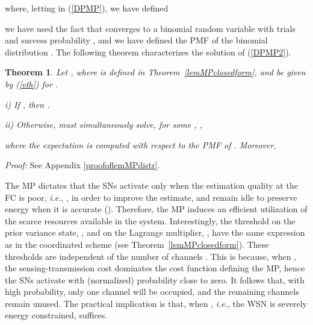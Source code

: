 \documentclass[10pt,twocolumn,twoside]{IEEEtran}
\newtheorem{thm}{Theorem}
\theoremstyle{plain}
\begin{document}
where, letting  in (\ref{DPMP}), we have defined

  we have used the fact that
  converges to a binomial random variable with  trials and success probability
  \cite[Corollary~1]{MichelusiP1},
and we have defined the PMF of the binomial distribution .
The following theorem characterizes the solution of (\ref{DPMP2}).
\vspace{-3mm}
\begin{thm}
\label{lemMPdistr}
Let
,
where  is defined in Theorem~\ref{lemMPclosedform},
and  be given by (\ref{vth}) for .

\noindent\emph{i)} If ,
then .

\noindent\emph{ii)} Otherwise, 
must simultaneously solve,
for some , ,

where the expectation is computed with respect to the PMF of .
Moreover,


\end{thm}
\noindent\emph{Proof:}
See Appendix \ref{proofoflemMPdistr}.
\hfill\QED

\noindent
The MP dictates that the SNs activate only when the estimation quality at the FC is poor, \emph{i.e.},
 , in order to improve the estimate, and remain idle to preserve energy when it is accurate ().
 Therefore, the MP induces an efficient utilization of the scarce resources available in the system.
 Interestingly, the threshold on the prior variance state, , and on the Lagrange multiplier, ,
 have the same expression as in the coordinated scheme (see Theorem~\ref{lemMPclosedform}).
 These thresholds are independent of the number of channels . This is because, when ,
 the sensing-transmission cost dominates the cost function defining the MP, hence the SNs activate with (normalized) probability close to
 zero. It follows that, with high probability, only one channel will be occupied, and the remaining channels remain unused. 
 The practical implication is that, when ,
 \emph{i.e.}, the WSN is severely energy constrained,  suffices. 
 
\end{document}
